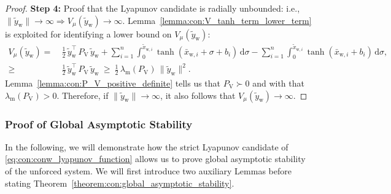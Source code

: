 \begin{proof}
    \textbf{Step 4:} Proof that the Lyapunov candidate is radially unbounded: i.e., $\lVert \tilde{y}_\mathrm{w} \rVert \rightarrow \infty \Rightarrow V_\mu(\tilde{y}_\mathrm{w}) \rightarrow \infty$. Lemma~\ref{lemma:con:V_tanh_term_lower_term} is exploited for identifying a lower bound on $V_\mu(\tilde{y}_\mathrm{w})$:
    \begin{equation}
    \begin{split}
        V_\mu(\tilde{y}_\mathrm{w}) =& \: \frac{1}{2} \, \tilde{y}_\mathrm{w}^\top \, P_\mathrm{V} \, \tilde{y}_\mathrm{w} + \sum_{i=1}^n \int_{0}^{\tilde{x}_{\mathrm{w},i}} \tanh(\bar{x}_{\mathrm{w},i}+\sigma+b_i) \, \mathrm{d} \sigma - \sum_{i=1}^n \int_{0}^{\tilde{x}_{\mathrm{w},i}} \tanh(\bar{x}_{\mathrm{w},i}+b_i) \, \mathrm{d} \sigma,\\
        \geq& \: \frac{1}{2} \, \tilde{y}_\mathrm{w}^\top \, P_\mathrm{V} \, \tilde{y}_\mathrm{w} \: \geq \: \frac{1}{2} \, \lambda_\mathrm{m}(P_\mathrm{V}) \, \lVert \tilde{y}_\mathrm{w} \rVert^2.
    \end{split}
    \end{equation}
    Lemma~\ref{lemma:con:P_V_positive_definite} tells us that $P_\mathrm{V} \succ 0$ and with that $\lambda_\mathrm{m}(P_\mathrm{V}) > 0$. Therefore, if $\lVert \tilde{y}_\mathrm{w} \rVert \rightarrow \infty$, it also follows that $V_\mu(\tilde{y}_\mathrm{w}) \rightarrow \infty$.
\end{proof}

\subsubsection{Proof of Global Asymptotic Stability}

In the following, we will demonstrate how the strict Lyapunov candidate of \eqref{eq:con:conw_lyapunov_function} allows us to prove global asymptotic stability of the unforced system. We will first introduce two auxiliary Lemmas before stating Theorem~\ref{theorem:con:global_asymptotic_stability}.

